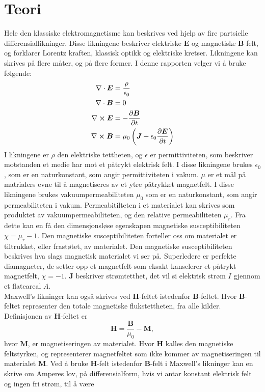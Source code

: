 \documentclass[%
 reprint,
 amsmath,amssymb,
 aps,
]{revtex4-1}
\begin{document}
\section{\label{sec:level2}Teori}
Hele den klassiske elektromagnetisme kan beskrives ved hjelp av fire partsielle differensiallikninger. Disse likningene beskriver elektriske $\bm{E}$ og magnetiske $\bm{B}$ felt, og forklarer Lorentz kraften, klassisk optikk og elektriske kretser. Likningene kan skrives på flere måter, og på flere former. I denne rapporten velger vi å bruke følgende:
\begin{align}
  \nabla \cdot \bm{E} &= \frac{\rho}{\epsilon_0} \\
  \nabla \cdot \bm{B} &= 0 \\
  \nabla \cross \bm{E} &= -\pdv{\bm{B}}{t} \\
  \nabla \cross \bm{B} &= \mu_0\left(\bm{J} + \epsilon_0\pdv{\bm{E}}{t}\right)
\end{align}
I likningene er $\rho$ den elektriske tettheten, og $\epsilon$ er permittiviteten, som beskriver motstanden et medie har mot et påtrykt elektrisk felt. I disse likningene brukes $\epsilon_0$, som er en naturkonstant, som angir permittiviteten i vakum. $\mu$ er et mål på matrialers evne til å magnetiseres av et ytre påtrykket magnetfelt. I disse likningene brukes vakuumpermeabiliteten $\mu_0$ som er en naturkonstant, som angir permeabiliteten i vakum. Permeabitilteten i et materialet kan skrives som produktet av vakuumpermeabiliteten, og den relative permeabiliteten $\mu_r$. Fra dette kan en få den dimensjonsløse egenskapen magnetiske susceptibiliteten $\chi = \mu_r - 1$. Den magnetiske susceptibiliteten forteller oss om materialet er tiltrukket, eller frastøtet, av materialet. Den magnetiske susceptibiliteten beskrives hva slags magnetisk materialet vi ser på. Superledere er perfekte diamagneter, de setter opp et magnetfelt som eksakt kanselerer et påtrykt magnetfelt, $\chi=-1$. $\bm{J}$ beskriver strømtetthet, det vil si elektrisk strøm $I$ gjennom et flateareal $A$. \\
Maxwell's likninger kan også skrives ved $\bm{H}$-feltet istedenfor $\bm{B}$-feltet. Hvor $\bm{B}$-feltet representer den totale magnetiske flukstettheten, fra alle kilder. Definisjonen av $\bm{H}$-feltet er
\begin{equation}
  \bm{H} = \frac{\bm{B}}{\mu_0}-\bm{M},
\end{equation}
hvor $\bm{M}$, er magnetiseringen av materialet. Hvor $\bm{H}$ kalles den magnetiske feltstyrken, og representerer magnetfeltet som ikke kommer av magnetiseringen til materialet $\bm{M}$. Ved å bruke $\bm{H}$-felt istedenfor $\bm{B}$-felt i Maxwell's likninger kan en skrive om Amperes lov, på differensialform, hvis vi antar konstant elektrisk felt og ingen fri strøm, til å være
\end{document}
